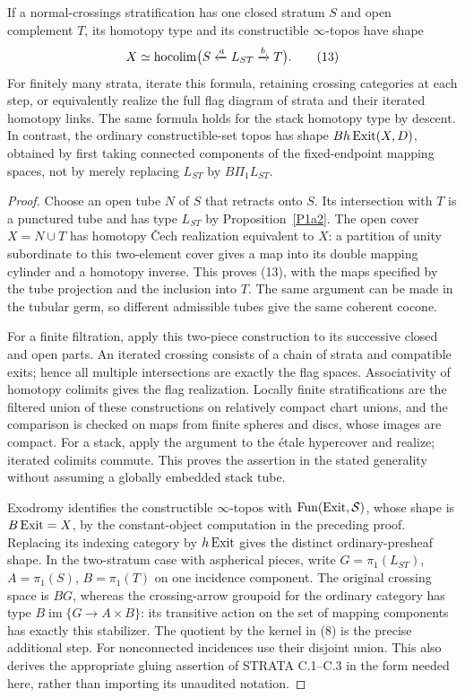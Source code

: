 \begin{theorem}\label{P1d1}
If a normal-crossings stratification has one closed stratum $S$ and
open complement $T$, its homotopy type and its constructible
$\infty$-topos have shape
\[
 X\simeq\operatorname{hocolim}\bigl(S\xleftarrow{a}L_{ST}
                               \xrightarrow{b}T\bigr).     \tag{13}
\]
For finitely many strata, iterate this formula, retaining crossing
categories at each step, or equivalently realize the full flag
diagram of strata and their iterated homotopy links.  The same formula
holds for the stack homotopy type by descent.  In contrast, the
ordinary constructible-set topos has shape $B h\operatorname{Exit}(X,D)$, obtained
by first taking connected components of the fixed-endpoint mapping
spaces, not by merely replacing $L_{ST}$ by $B\Pi_1L_{ST}$.
\end{theorem}
\begin{proof}
Choose an open tube $N$ of $S$ that retracts onto $S$.  Its intersection
with $T$ is a punctured tube and has type $L_{ST}$ by
Proposition~\ref{P1a2}.  The open cover $X=N\cup T$ has homotopy
Čech realization equivalent to $X$: a partition of unity subordinate
to this two-element cover gives a map into its double mapping
cylinder and a homotopy inverse.  This proves (13), with the maps
specified by the tube projection and the inclusion into $T$.
The same argument can be made in the tubular germ, so different
admissible tubes give the same coherent cocone.

For a finite filtration, apply this two-piece construction to its
successive closed and open parts.  An iterated crossing consists of
a chain of strata and compatible exits; hence all multiple
intersections are exactly the flag spaces.  Associativity of
homotopy colimits gives the flag realization.  Locally finite
stratifications are the filtered union of these constructions on
relatively compact chart unions, and the comparison is checked on
maps from finite spheres and discs, whose images are compact.
For a stack, apply the argument to the étale hypercover and realize;
iterated colimits commute.  This proves the assertion in the stated
generality without assuming a globally embedded stack tube.

Exodromy identifies the constructible $\infty$-topos with
$\operatorname{Fun}(\operatorname{Exit},\mathcal S)$, whose shape is $B\operatorname{Exit}=X$,
by the constant-object computation in the preceding proof.
Replacing its indexing category by $h\operatorname{Exit}$ gives the distinct
ordinary-presheaf shape.  In the two-stratum case with aspherical
pieces, write
$G=\pi_1(L_{ST})$, $A=\pi_1(S)$, $B=\pi_1(T)$ on one incidence
component.  The original crossing space is $BG$, whereas the
crossing-arrow groupoid for the ordinary category has type
$B\operatorname{im}\{G\to A\times B\}$: its transitive action on
the set of mapping components has exactly this stabilizer.
The quotient by the kernel in (8) is the precise additional step.
For nonconnected incidences use their disjoint union.  This also
derives the appropriate gluing assertion of STRATA C.1--C.3 in the
form needed here, rather than importing its unaudited notation.
\end{proof}

